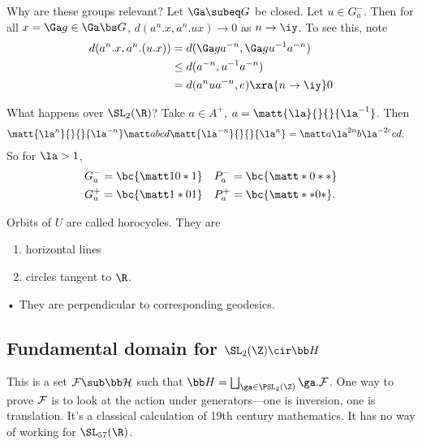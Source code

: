 Why are these groups relevant? Let $\Ga \subeq G$ be closed. Let $u\in G_a^-$. Then for all $x=\Ga g\in \Ga\bs G$, $d(a^n.x, a^n.ux)\to 0$ as $n\to \iy$.  To see this, note
\begin{align}
d(a^n.x,a^n.(u.x)) 
&= d(\Ga ga^{-n},\Ga gu^{-1}a^{-n})\\%
&\le d(a^{-n}, u^{-1}a^{-n}) \\
&= d(a^n ua^{-n},e)\xra{n\to \iy}0
\end{align}

What happens over $\SL_2(\R)$? Take $a\in A^+$, $a=\matt{\la}{}{}{\la^{-1}}$. Then
\begin{align}
\matt{\la^n}{}{}{\la^{-n}}\matt abcd \matt{\la^{-n}}{}{}{\la^n} &= \matt a{\la^{2n}b}{\la^{-2c}c}d.
\end{align}
So for $\la>1$, 
\begin{align}
G_a^- &= \bc{\matt 10*1} & P_a^- &= \bc{\matt *0**}\\
G_a^+ &= \bc{\matt 1*01} & P_a^+ &= \bc{\matt **0*}.
\end{align}

Orbits of $U$ are called horocycles. They are
\begin{enumerate}
\item
horizontal lines
\item
circles tangent to $\R$.
\end{enumerate}•
They are perpendicular to corresponding geodesics.

\subsection{Fundamental domain for $\SL_2(\Z)\cir \bb H$}

This is a set $ \cal F\sub \bb H$ such that $\bb H = \bigsqcup_{\ga\in \PSL_2(\Z)} \ga . \cal F$.
One way to prove $\cal F$ is to look at the action under generators---one is inversion, one is translation. It's a classical calculation of 19th century mathematics. It has no way of working for $\SL_{57}(\R)$. 

